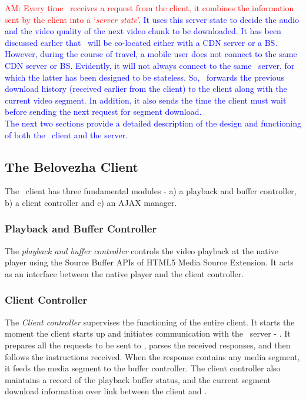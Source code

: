 \indent \textcolor{red}{AM: Every time \servname\ receives a request from the client, it combines the information sent by the client into a `\textit{server state}'}. \textcolor{blue}{ It uses this server state to decide the audio and the video quality of the next video chunk to be downloaded. It has been discussed earlier that \servname\ will be co-located either with a  \ac{CDN} server or a \ac{BS}. However, during the course of travel, a mobile user does not connect to the same \ac{CDN} server or \ac{BS}. Evidently, it will not always connect to the same \servname\ server, for which the latter has been designed to be stateless.  So, \servname\ forwards the previous download history (received earlier from the client) to the client along with the current video segment. In addition, it also sends the time the client must wait before sending the next request for segment download.\\
\indent The next two sections provide a detailed description of the design and functioning of both the \bel\ client and the server.}
\subsection{The Belovezha Client}
The \bel\ client has three fundamental modules - a) a playback and buffer controller, b) a client controller and c) an AJAX manager.
\subsubsection{Playback and Buffer Controller}
    The \textit{playback and buffer controller} controls the video playback at the native player using the Source Buffer APIs of HTML5 Media Source Extension. It acts as an interface between the native player and the client controller.
\subsubsection{Client Controller}
The \textit{Client controller} supervises the functioning of the entire client. It starts the moment the client starts up and  initiates communication with the \bel\ server - \servname. It prepares all the requests to be sent to \servname, parses the received responses, and then  follows the instructions received. When the response contains any media segment, it feeds the media segment to the buffer controller. The client controller also maintains a record of the playback buffer status, and the current segment download information over link between the client and \servname.
